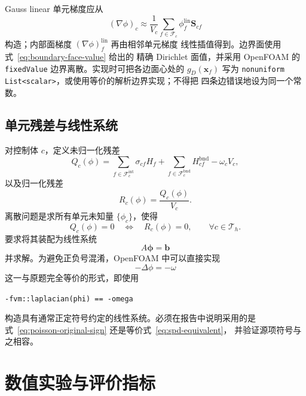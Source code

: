 \documentclass[11pt,a4paper]{ctexart}
\newcommand{\T}{\mathcal{T}}
\newcommand{\F}{\mathcal{F}}
\begin{document}
Gauss linear 单元梯度应从
\begin{equation}
  (\nabla\phi)_c
  \approx\frac{1}{V_c}
  \sum_{f\in\F_c}\phi_f^{\mathrm{lin}}\mathbf S_{cf}
  \label{eq:gauss-gradient}
\end{equation}
构造；内部面梯度 $(\nabla\phi)_f^{\mathrm{lin}}$ 再由相邻单元梯度
线性插值得到。边界面使用式~\eqref{eq:boundary-face-value} 给出的
精确 Dirichlet 面值，并采用 OpenFOAM 的 \texttt{fixedValue}
边界离散。实现时可把各边面心处的 $g_D(\mathbf x_f)$ 写为
\texttt{nonuniform List<scalar>}，或使用等价的解析边界实现；不得把
四条边错误地设为同一个常数。

\subsection{单元残差与线性系统}

对控制体 $c$，定义未归一化残差
\begin{equation}
  Q_c(\phi)
  =\sum_{f\in\F_c^{\mathrm{int}}}\sigma_{cf}H_f
  +\sum_{f\in\F_c^{\mathrm{bnd}}}H_{cf}^{\mathrm{bnd}}
  -\omega_cV_c,
  \label{eq:Qc}
\end{equation}
以及归一化残差
\begin{equation}
  R_c(\phi)=\frac{Q_c(\phi)}{V_c}.
  \label{eq:Rc}
\end{equation}
离散问题是求所有单元未知量 $\{\phi_c\}$，使得
\begin{equation}
  Q_c(\phi)=0
  \quad\Longleftrightarrow\quad
  R_c(\phi)=0,
  \qquad \forall c\in\T_h.
  \label{eq:algebraic-problem}
\end{equation}
要求将其装配为线性系统
\begin{equation}
  A\boldsymbol\phi=\mathbf b
\end{equation}
并求解。为避免正负号混淆，OpenFOAM 中可以直接实现
\begin{equation}
  -\Delta\phi=-\omega
  \label{eq:spd-equivalent}
\end{equation}
这一与原题完全等价的形式，即使用
\begin{center}
\texttt{-fvm::laplacian(phi) == -omega}
\end{center}
构造具有通常正定符号约定的线性系统。必须在报告中说明采用的是
式~\eqref{eq:poisson-original-sign} 还是等价式~\eqref{eq:spd-equivalent}，
并验证源项符号与之相容。

\section{数值实验与评价指标}
\end{document}
